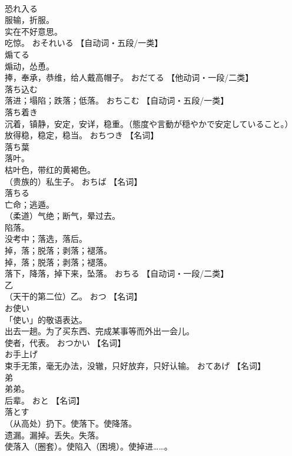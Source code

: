 \documentclass[8pt]{extreport}
\begin{document}
\begin{CJK}{UTF8}{min}
\\	恐れ入る	
\\	服输，折服。 
\\	实在不好意思。 
\\	吃惊。	おそれいる		【自动词・五段/一类】
\\	煽てる	
\\	煽动，怂恿。 
\\	捧，奉承，恭维，给人戴高帽子。	おだてる		【他动词・一段/二类】
\\	落ち込む	
\\	落进；塌陷；跌落；低落。	おちこむ		【自动词・五段/一类】
\\	落ち着き	
\\	沉着，镇静，安定，安详，稳重。（態度や言動が穏やかで安定していること。） 
\\	放得稳，稳定，稳当。	おちつき		【名词】
\\	落ち葉	
\\	落叶。 
\\	枯叶色，带红的黄褐色。 
\\	（贵族的）私生子。	おちば		【名词】
\\	落ちる	
\\	亡命；逃遁。 
\\	（柔道）气绝；断气，晕过去。 
\\	陷落。 
\\	没考中；落选，落后。 
\\	掉，落；脱落；剥落；褪落。 
\\	掉，落；脱落；剥落；褪落。 
\\	落下，降落，掉下来，坠落。	おちる		【自动词・一段/二类】
\\	乙	
\\	（天干的第二位）乙。	おつ		【名词】
\\	お使い	
\\	「使い」的敬语表达。 
\\	出去一趟。为了买东西、完成某事等而外出一会儿。 
\\	使者，代表。	おつかい		【名词】
\\	お手上げ	
\\	束手无策，毫无办法，没辙，只好放弃，只好认输。	おてあげ		【名词】
\\	弟	
\\	弟弟。 
\\	后辈。	おと		【名词】
\\	落とす	
\\	（从高处）扔下。使落下。使降落。 
\\	遗漏。漏掉。丢失。失落。 
\\	使落入（圈套）。使陷入（困境）。使掉进……。 

\end{CJK}
\end{document}
